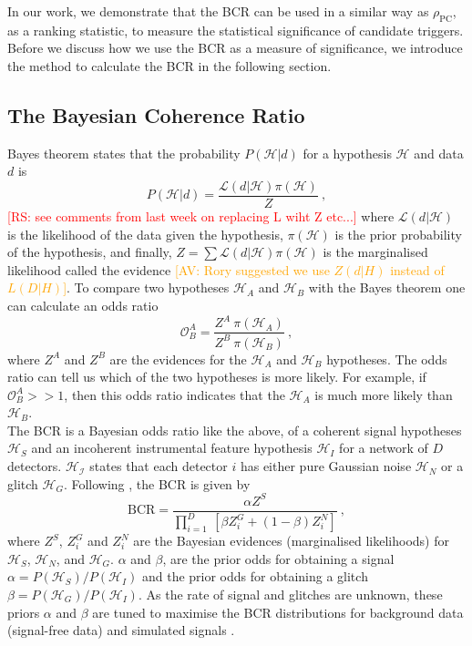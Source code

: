\documentclass[%
preprint,
 amsmath,amssymb,
 aps,
]{revtex4}
\newcommand{\bcr}{{\sc BCR}\xspace}
\newcommand{\av}[1]{\textcolor{orange}{[AV: #1]}}
\newcommand{\rs}[1]{\textcolor{red}{[RS: #1]}}
\begin{document}
In our work, we demonstrate that the \bcr can be used in a similar way as $\rho_\text{PC}$, as a ranking statistic, to measure the statistical significance of candidate triggers. Before we discuss how we use the \bcr as a measure of significance, we introduce the method to calculate the \bcr in the following section.\\


\subsection{The Bayesian Coherence Ratio}

Bayes theorem states that the probability $P(\mathcal{H}|d)$ for a hypothesis $\mathcal{H}$ and data $d$ is
\begin{equation}
    P(\mathcal{H}|d) = \frac{\mathcal{L}(d|\mathcal{H})\pi(\mathcal{H})}{Z}\ , 
\end{equation}
\rs{see comments from last week on replacing L wiht Z etc...}
where $\mathcal{L}(d|\mathcal{H})$ is the likelihood of the data given
the hypothesis,  $\pi(\mathcal{H})$ is the prior probability of the hypothesis, and finally, $Z = \sum \mathcal{L}(d|\mathcal{H})  \pi(\mathcal{H})$ is the marginalised likelihood called the evidence \av{Rory suggested we use $Z(d|H)$ instead of $L(D|H)$}.  To compare two hypotheses $\mathcal{H}_A$ and $\mathcal{H}_B$ with the Bayes theorem one can calculate an odds ratio
\begin{equation}
    \mathcal{O}^A_B = \frac{Z^A\ \pi(\mathcal{H}_A)}{Z^B\ \pi(\mathcal{H}_B)}\ ,
\end{equation}
where $Z^A$ and $Z^B$ are the evidences for the $\mathcal{H}_A$ and $\mathcal{H}_B$ hypotheses. The odds ratio can tell us which of the two hypotheses is more likely. For example, if $\mathcal{O}^A_B >> 1$, then this odds ratio indicates that the $\mathcal{H}_A$ is much more likely than $\mathcal{H}_B$. \\

The \bcr is a Bayesian odds ratio like the above, of a coherent signal hypotheses $\mathcal{H}_S$ and an incoherent instrumental feature hypothesis $\mathcal{H}_I$ for a network of $D$ detectors. $\mathcal{H_I}$ states that each detector $i$ has either pure Gaussian noise $\mathcal{H}_N$ or a glitch $\mathcal{H}_G$. Following \citet{BCR1}, the \bcr is given by
\begin{equation}
\label{eq:bcr}
\text{BCR} = \frac{\alpha Z^S}{\prod\limits^D_{i=1} \ [\beta Z^G_i + (1-\beta)Z^N_i]}\ ,
\end{equation}
where $Z^S$, $Z^G_i$ and $Z^N_i$ are the Bayesian evidences (marginalised likelihoods) for $\mathcal{H}_S$, $\mathcal{H}_N$, and $\mathcal{H}_G$. $\alpha$ and $\beta$, are the prior odds for obtaining a signal $\alpha=P(\mathcal{H}_S)/P(\mathcal{H}_I)$ and the prior odds for obtaining a glitch $\beta=P(\mathcal{H}_G)/P(\mathcal{H}_I)$. As the rate of signal and glitches are unknown, these priors $\alpha$ and $\beta$ are tuned to maximise the \bcr distributions for background data (signal-free data) and simulated signals \cite{BCR1}.  \\
\end{document}
